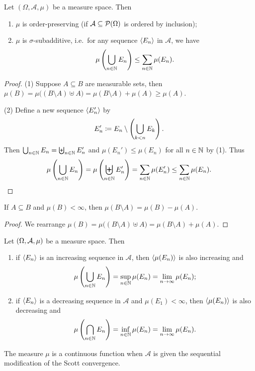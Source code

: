\begin{proposition}
Let $(\Omega, \mathcal{A}, \mu)$ be a measure space. Then
\begin{enumerate}
\item $\mu$ is order-preserving (if $\mathcal{A}\subseteq \operatorname{\mathcal{P}}(\Omega)$ is ordered by inclusion);
\item $\mu$ is $\sigma$-subadditive, i.e.\ for any sequence $\left\langle E_n \right\rangle$ in $\mathcal{A}$, we have
\[ \mu\left(\bigcup_{n\in\mathbb{N}}E_n\right) \leq \sum_{n\in\mathbb{N}}\mu(E_n). \]
\end{enumerate}
\end{proposition}
\begin{proof}
(1) Suppose $A \subseteq B$ are measurable sets, then $\mu(B) = \mu\big((B\setminus A) \uplus A\big) = \mu(B\setminus A) + \mu(A) \geq \mu(A)$.

(2) Define a new sequence $\left\langle E_n' \right\rangle$ by
\[ E_n' \coloneqq E_n\setminus \left(\bigcup_{k<n}E_k\right). \]
Then $\bigcup_{n\in\mathbb{N}}E_n = \biguplus_{n\in\mathbb{N}}E_n'$ and $\mu(E_n')\leq \mu(E_n)$ for all $n\in \mathbb{N}$ by (1). Thus
\[ \mu\left(\bigcup_{n\in\mathbb{N}}E_n\right) = \mu\left(\biguplus_{n\in\mathbb{N}}E_n'\right) =  \sum_{n\in\mathbb{N}}\mu(E'_n) \leq \sum_{n\in\mathbb{N}}\mu(E_n). \]
\end{proof}
\begin{corollary}
If $A\subseteq B$ and $\mu(B) < \infty$, then $\mu(B\setminus A) = \mu(B)-\mu(A)$.
\end{corollary}
\begin{proof}
We rearrange $\mu(B) = \mu\big((B\setminus A) \uplus A\big) = \mu(B\setminus A) + \mu(A)$.
\end{proof}
\begin{proposition}
Let $\left( \Omega, \mathcal{A}, \mu \right)$ be a measure space. Then
\begin{enumerate}
\item if $\left\langle E_n \right\rangle$ is an increasing sequence in $\mathcal{A}$, then $\left\langle \mu(E_n) \right\rangle$ is also increasing and
\[ \mu\left(\bigcup_{n\in\mathbb{N}}E_n\right) = \sup_{n\in\mathbb{N}}\mu(E_n) = \lim_{n\to\infty}\mu(E_n); \]
\item if $\left\langle E_n \right\rangle$ is a decreasing sequence in $\mathcal{A}$ and $\mu(E_1)<\infty$, then $\left\langle \mu(E_n) \right\rangle$ is also decreasing and
\[ \mu\left(\bigcap_{n\in\mathbb{N}}E_n\right) = \inf_{n\in\mathbb{N}}\mu(E_n) = \lim_{n\to\infty}\mu(E_n). \]
\end{enumerate}
\end{proposition}
\begin{corollary}
The measure $\mu$ is a continuous function when $\mathcal{A}$ is given the sequential modification of the Scott convergence.
\end{corollary}


